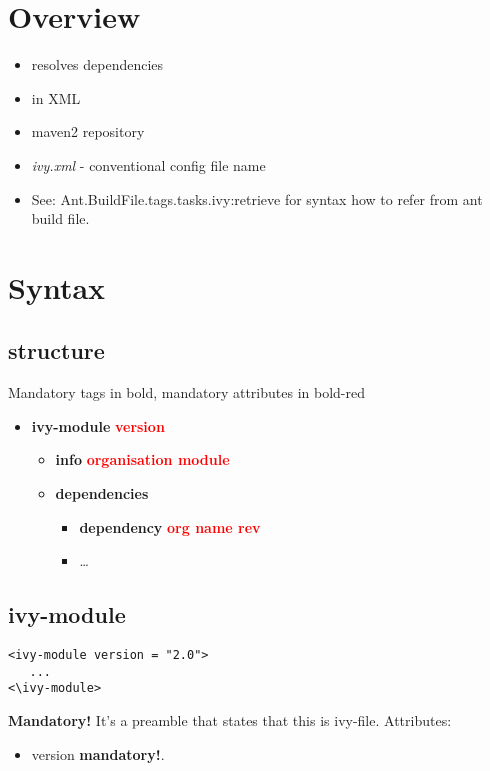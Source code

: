 \documentclass{report}
\begin{document}
\chapter{Overview}
\begin{itemize}
  \item resolves dependencies
  \item in XML
  \item maven2 repository
  \item \textit{ivy.xml} - conventional config file name
  \item See: Ant.BuildFile.tags.tasks.ivy:retrieve for syntax how to refer from ant
  build file.
\end{itemize}



\chapter{Syntax}


\section{structure}
Mandatory tags in bold, mandatory attributes in bold-red
\begin{itemize}
  \item \textbf{ivy-module} \textbf{\textcolor{red}{version}}
  \begin{itemize}
    \item \textbf{info} \textbf{\textcolor{red}{organisation module}}
    \item \textbf{dependencies}
    \begin{itemize}
      \item \textbf{dependency} \textbf{\textcolor{red}{org name rev}}
      \item \ldots
    \end{itemize}
  \end{itemize}
\end{itemize}


\section{ivy-module}

\begin{verbatim}
<ivy-module version = "2.0">
   ...
<\ivy-module>
\end{verbatim}

\textbf{Mandatory!} It's a preamble that states that this is ivy-file. 
Attributes:
\begin{itemize}
  \item version \textbf{mandatory!}.
\end{itemize}
\end{document}
